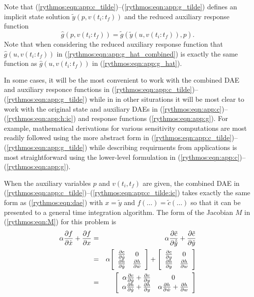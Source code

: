\documentclass[pdf,ps2pdf,11pt]{SANDreport}
\begin{document}
Note that (\ref{rythmos:eqn:app:c_tilde})--(\ref{rythmos:eqn:app:g_tilde})
defines an implicit state solution $\tilde{y}(p,v(t_i:t_f))$ and the reduced auxiliary
response function
%
\begin{equation}
\hat{g}(p,v(t_i:t_f)) = \tilde{g}(\tilde{y}(u,v(t_i:t_f)),p).
\label{rythmos:eqn:app:g_hat_combined}
\end{equation}
%
Note that when considering the reduced auxiliary response function that
$\hat{g}(u,v(t_i:t_f))$ in (\ref{rythmos:eqn:app:g_hat_combined}) is exactly
the same function as $\hat{g}(u,v(t_i:t_f))$ in (\ref{rythmos:eqn:app:g_hat}).

In some cases, it will be the most convenient to work with the combined DAE
and auxiliary responce functions in
(\ref{rythmos:eqn:app:c_tilde})--(\ref{rythmos:eqn:app:g_tilde}) while in in
other siturations it will be most clear to work with the original state and
auxiliary DAEs in (\ref{rythmos:eqn:app:c})--(\ref{rythmos:eqn:app:h:ic}) and
response functions (\ref{rythmos:eqn:app:g}).  For example, mathematical
derivations for various sensitivity computations are most readily followed
using the more abstract form in
(\ref{rythmos:eqn:app:c_tilde})--(\ref{rythmos:eqn:app:g_tilde}) while
describing requirments from applications is most straightforward using the
lower-level formulation in
(\ref{rythmos:eqn:app:c})--(\ref{rythmos:eqn:app:g}).

When the auxiliary variables $p$ and $v(t_i,t_f)$ are given, the combined DAE
in (\ref{rythmos:eqn:app:c_tilde})--(\ref{rythmos:eqn:app:c_tilde:ic}) takes
exactly the same form as (\ref{rythmos:eqn:dae}) with $x = \tilde{y}$ and
$f(\ldots) = \tilde{c}(\ldots)$ so that it can be presented to a general time
integration algorithm.  The form of the Jacobian $M$ in (\ref{rythmos:eqn:M})
for this problem is
%
\begin{eqnarray}
\alpha \frac{\partial f}{\partial \dot{x}} + \frac{\partial f}{\partial x}
& = & \alpha \frac{\partial \tilde{c}}{\partial \dot{\tilde{y}}} + \frac{\partial \tilde{c}}{\partial \tilde{y}} \nonumber \\
& = & \alpha {\bmat{cc}
          \frac{\partial c}{\partial \dot{y}} & 0 \\
          \frac{\partial h}{\partial \dot{y}} & \frac{\partial h}{\partial \dot{w}}
       \emat}
       + {\bmat{cc}
          \frac{\partial c}{\partial y} & 0 \\
          \frac{\partial h}{\partial y} & \frac{\partial h}{\partial  w}
       \emat} \nonumber \\
& = & {\bmat{cc}
      \alpha \frac{\partial c}{\partial \dot{y}} + \frac{\partial c}{\partial y}
      & 0 \\
      \alpha \frac{\partial h}{\partial \dot{y}} + \frac{\partial h}{\partial y}
      & \alpha \frac{\partial h}{\partial \dot{w}} + \frac{\partial h}{\partial w}
       \emat} \label{rythmos:eqn:c_tilde_jac}
\end{eqnarray}
\end{document}
